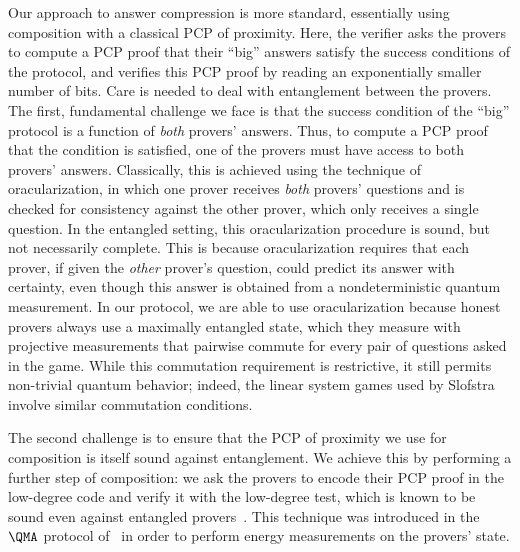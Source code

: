 Our approach to answer compression is more standard, essentially using composition with a
classical PCP of proximity. Here, the verifier asks the provers
to compute a PCP proof that their ``big'' answers satisfy the success
conditions of the protocol, and verifies this PCP proof by reading an
exponentially smaller number of bits. Care is needed to deal
with entanglement between the provers. The first, fundamental
challenge we face is that the success condition of the ``big''
protocol is a function of \emph{both} provers' answers. Thus, to
compute a PCP proof that the condition is satisfied, one of the
provers must have access to both provers' answers. Classically, this
is achieved using the technique of oracularization, in which one prover
receives \emph{both} provers' questions and is checked for consistency
against the other prover, which only receives a single question. In
the entangled setting, this oracularization procedure is sound, but not
necessarily complete. This is because oracularization requires that each prover, if given the
\emph{other} prover's question, could predict its answer with
certainty, even though this answer is obtained from a nondeterministic
quantum measurement. In our protocol, we are able to use
oracularization because honest provers always use
a maximally entangled state, which they measure with projective
measurements that pairwise commute for every pair of questions asked
in the game. While this commutation requirement is restrictive, it
still permits non-trivial quantum behavior; indeed, the linear system games used by Slofstra~\cite{Slo19}
involve similar commutation conditions.


The second challenge is to ensure that the PCP of proximity we use for
composition is itself sound against entanglement. We achieve this by
performing a further step of composition: we ask the provers to encode
their PCP proof in the low-degree code and verify it with the
low-degree test, which is known to be sound even against entangled
provers~\cite{NV18b}. This technique was introduced in the $\QMA$
protocol of~\cite{NV18a} in
order to perform energy measurements on the provers' state.



